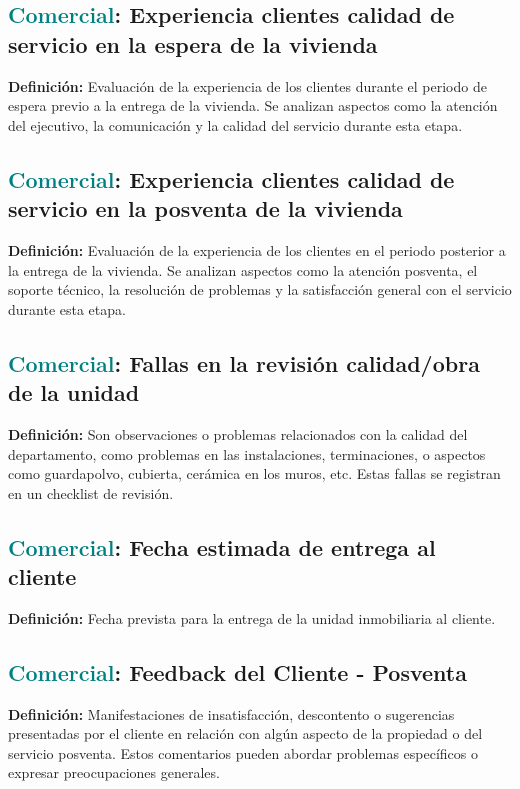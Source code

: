 \documentclass[12pt]{article}
\begin{document}
\subsection{\textcolor{teal}{Comercial}: Experiencia clientes calidad de servicio en la espera de la vivienda}
\textbf{Definición:} Evaluación de la experiencia de los clientes durante el periodo de espera previo a la entrega de la vivienda. Se analizan aspectos como la atención del ejecutivo, la comunicación y la calidad del servicio durante esta etapa.
\subsection{\textcolor{teal}{Comercial}: Experiencia clientes calidad de servicio en la posventa de la vivienda}
\textbf{Definición:} Evaluación de la experiencia de los clientes en el periodo posterior a la entrega de la vivienda. Se analizan aspectos como la atención posventa, el soporte técnico, la resolución de problemas y la satisfacción general con el servicio durante esta etapa.
\subsection{\textcolor{teal}{Comercial}: Fallas en la revisión calidad/obra de la unidad}
\textbf{Definición:} Son observaciones o problemas relacionados con la calidad del departamento, como problemas en las instalaciones, terminaciones, o aspectos como guardapolvo, cubierta, cerámica en los muros, etc. Estas fallas se registran en un checklist de revisión.
\subsection{\textcolor{teal}{Comercial}: Fecha estimada de entrega al cliente}
\textbf{Definición:} Fecha prevista para la entrega de la unidad inmobiliaria al cliente.
\subsection{\textcolor{teal}{Comercial}: Feedback del Cliente - Posventa}
\textbf{Definición:} Manifestaciones de insatisfacción, descontento o sugerencias presentadas por el cliente en relación con algún aspecto de la propiedad o del servicio posventa. Estos comentarios pueden abordar problemas específicos o expresar preocupaciones generales.
\end{document}
